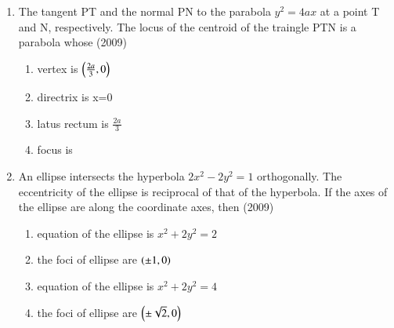 \documentclass[journal,12pt,onecolumn]{IEEEtran}
\theoremstyle{remark}
\begin{document}
\begin{enumerate}
	\item The tangent PT and the normal PN to the parabola $y^2=4ax$ at a point T and N, respectively. The locus of the centroid of the traingle PTN is a parabola whose \hfill(2009)\\
		\begin{enumerate}
			\item vertex is $\left(\frac{2a}{3},0\right)$
			\item directrix is x=0
			\item latus rectum is $\frac{2a}{3}$
			\item focus is 
		\end{enumerate}

	\item An ellipse intersects the hyperbola $2x^2-2y^2=1$ orthogonally. The eccentricity of the ellipse is reciprocal of that of the hyperbola. If the axes of the ellipse are along the coordinate axes, then \hfill (2009)\\
		\begin{enumerate}
			\item equation of the ellipse is $x^2+2y^2=2$
			\item the foci of ellipse are $\left(\pm1,0\right)$
			\item equation of the ellipse is $x^2+2y^2=4$
			\item the foci of ellipse are $\left(\pm\sqrt{2},0\right)$
		\end{enumerate}











\end{enumerate}
\end{document}
